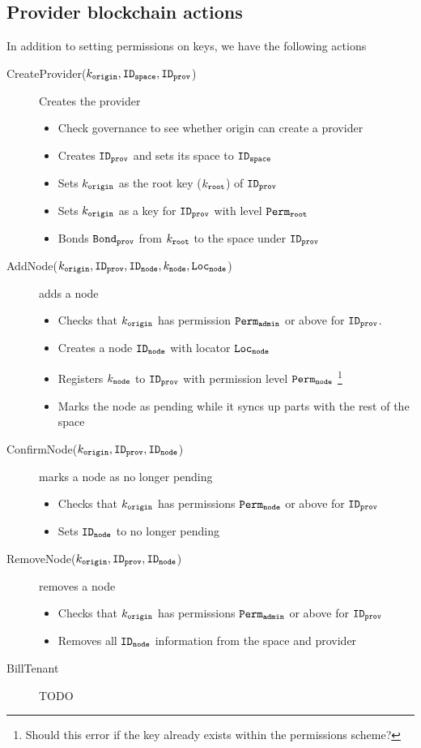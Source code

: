 \subsection{Provider blockchain actions}
In addition to setting permissions on keys, we have the following actions
\begin{description}
  \item[CreateProvider($k_\mathtt{origin}, \mathtt{ID_{space}}, \mathtt{ID_{prov}}$)] Creates the provider
    \begin{itemize}
      \item Check governance to see whether origin can create a provider
      \item Creates $\mathtt{ID_{prov}}$ and sets its space to $\mathtt{ID_{space}}$
      \item Sets $k_\mathtt{origin}$ as the root key ($k_\mathtt{root}$) of $\mathtt{ID_{prov}}$
      \item Sets $k_\mathtt{origin}$ as a key for $\mathtt{ID_{prov}}$ with level $\mathtt{Perm_{root}}$
      \item Bonds $\mathtt{Bond_{prov}}$ from $k_\mathtt{root}$ to the space under $\mathtt{ID_{prov}}$
    \end{itemize}
  \item[AddNode($k_\mathtt{origin}, \mathtt{ID_{prov}}, \mathtt{ID_{node}}, k_\mathtt{node}, \mathtt{Loc_{node}}$)] adds a node
    \begin{itemize}
      \item Checks that $k_\mathtt{origin}$ has permission $\mathtt{Perm_{admin}}$ or above for $\mathtt{ID_{prov}}$.
      \item Creates a node $\mathtt{ID_{node}}$ with locator $\mathtt{Loc_{node}}$
      \item Registers $k_\mathtt{node}$ to $\mathtt{ID_{prov}}$ with permission level $\mathtt{Perm_{node}}$ \footnote{Should this error if the key already exists within the permissions scheme?}
      \item Marks the node as pending while it syncs up parts with the rest of the space
    \end{itemize}
  \item[ConfirmNode($k_\mathtt{origin}, \mathtt{ID_{prov}}, \mathtt{ID_{node}}$)] marks a node as no longer pending
    \begin{itemize}
      \item Checks that $k_\mathtt{origin}$ has permissions $\mathtt{Perm_{node}}$ or above for $\mathtt{ID_{prov}}$
      \item Sets $\mathtt{ID_{node}}$ to no longer pending
    \end{itemize}
  \item[RemoveNode($k_\mathtt{origin}, \mathtt{ID_{prov}}, \mathtt{ID_{node}}$)] removes a node
    \begin{itemize}
      \item Checks that $k_\mathtt{origin}$ has permissions $\mathtt{Perm_{admin}}$ or above for $\mathtt{ID_{prov}}$
      \item Removes all $\mathtt{ID_{node}}$ information from the space and provider
    \end{itemize}
  \item[BillTenant] TODO
\end{description}
